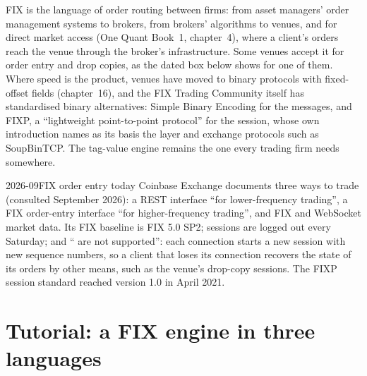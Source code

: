 FIX is the language of order routing between firms: from asset managers' order management systems to brokers, from brokers'
algorithms to venues, and for direct market access (One Quant Book~1, chapter~4), where a client's orders reach the venue
through the broker's infrastructure. Some venues accept it for order entry and drop copies, as the dated box below shows for one of them. Where speed is the
product, venues
have moved to binary protocols with fixed-offset fields (chapter~16), and the FIX Trading Community itself has standardised
binary alternatives: Simple Binary Encoding for the messages, and FIXP, a ``lightweight point-to-point protocol'' for the
session, whose own introduction names as its basis the  layer and exchange protocols such as SoupBinTCP. The
tag-value engine remains the one every trading firm needs somewhere.

\begin{dated}{2026-09}{FIX order entry today}\label{dat:ll:protocols-i-fix:today}
Coinbase Exchange documents three ways to trade (consulted September 2026): a REST interface ``for lower-frequency
trading'', a FIX order-entry interface ``for higher-frequency trading'', and FIX and WebSocket market data. Its FIX baseline
is FIX 5.0 SP2; sessions are logged out every Saturday; and `` are not supported'': each connection starts a
new session with new sequence numbers, so a client that loses its connection recovers the state of its orders by other
means, such as the venue's drop-copy sessions. The FIXP session standard reached version 1.0 in April 2021.
\end{dated}

\section{Tutorial: a FIX engine in three languages}\label{tut:ll:protocols-i-fix:tut}

